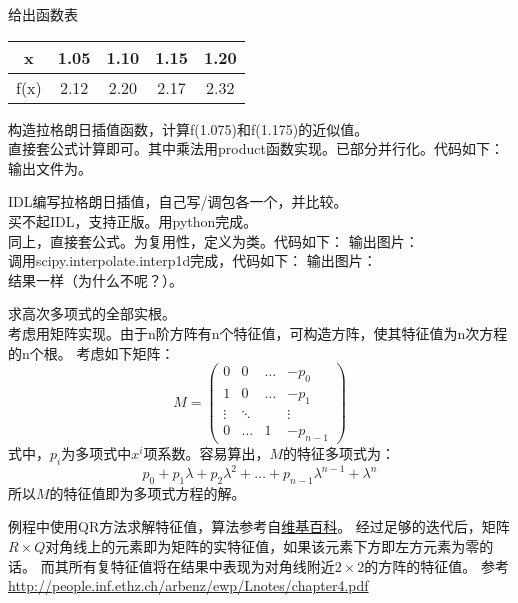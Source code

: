 \documentclass{ctexart}
\begin{document}
\maketitle

\begin{answer}

    给出函数表
    \begin{tabular}{c|cccc}
        \hline
        x & 1.05 & 1.10 & 1.15 & 1.20 \\
        \hline
        f(x) & 2.12 & 2.20 & 2.17 & 2.32\\
        \hline
    \end{tabular}
    构造拉格朗日插值函数，计算f(1.075)和f(1.175)的近似值。\\

    直接套公式计算即可。其中乘法用product函数实现。已部分并行化。代码如下：
    输出文件为。

    IDL编写拉格朗日插值，自己写/调包各一个，并比较。\\

    买不起IDL，支持正版。用python完成。\\
    同上，直接套公式。为复用性，定义为类。代码如下：
    输出图片：
    \\
    调用scipy.interpolate.interp1d完成，代码如下：
    输出图片：
    \\
    结果一样（为什么不呢？）。

    求高次多项式的全部实根。\\

    考虑用矩阵实现。由于n阶方阵有n个特征值，可构造方阵，使其特征值为n次方程的n个根。
    考虑如下矩阵：
    \[ M = \begin{pmatrix}
        0 & 0 & \dots & -p_0 \\
        1 & 0 & \dots & -p_1 \\
        \vdots & \ddots & & \vdots \\
        0 & \dots & 1 & -p_{n-1}
    \end{pmatrix} \]
    式中，$p_i$为多项式中$x^i$项系数。容易算出，$M$的特征多项式为：
    \[p_0 + p_1\lambda + p_2\lambda^2 + \dots + p_{n-1}\lambda^{n-1} + \lambda^{n}\]
    所以$M$的特征值即为多项式方程的解。

    例程中使用QR方法求解特征值，算法参考自\href{https://zh.wikipedia.org/wiki/QR\%E5\%88\%86\%E8\%A7\%A3}{维基百科}。
    经过足够的迭代后，矩阵$R\times Q$对角线上的元素即为矩阵的实特征值，如果该元素下方即左方元素为零的话。
    而其所有复特征值将在结果中表现为对角线附近$2\times 2$的方阵的特征值。
    参考\href{http://people.inf.ethz.ch/arbenz/ewp/Lnotes/chapter4.pdf}{http://people.inf.ethz.ch/arbenz/ewp/Lnotes/chapter4.pdf}


\end{answer}
\end{document}
